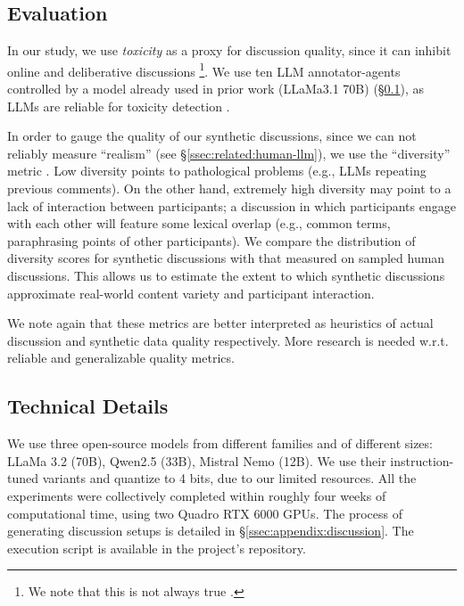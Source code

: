 \subsection{Evaluation}
\label{ssec:experimental:evaluation}

In our study, we use \emph{toxicity} as a proxy for discussion quality, since it can inhibit online and deliberative discussions \citep{dekock2022disagree, XiaToxicity}\footnote{We note that this is not always true \citep{Avalle2024PersistentIP}.}. We use ten \ac{LLM} annotator-agents controlled by a model already used in prior work (LLaMa3.1 70B) \cite{kang-qian-2024-implanting} (\S\ref{ssec:experimental:evaluation}), as \acp{LLM} are reliable for toxicity detection \citep{kang-qian-2024-implanting, Wang2022ToxicityDW, anjum2024hate}.

In order to gauge the quality of our synthetic discussions, since we can not reliably measure ``realism'' (see \S\ref{ssec:related:human-llm}), we use the ``diversity'' metric \citep{ulmer2024}. Low diversity points to pathological problems (e.g., \acp{LLM} repeating previous comments). On the other hand, extremely high diversity may point to a lack of interaction between participants; a discussion in which participants engage with each other will feature some lexical overlap (e.g., common terms, paraphrasing points of other participants). We compare the distribution of diversity scores for synthetic discussions with that measured on sampled human discussions. This allows us to estimate the extent to which synthetic discussions approximate real-world content variety and participant interaction. 

We note again that these metrics are better interpreted as heuristics of actual discussion and synthetic data quality respectively. More research is needed w.r.t. reliable and generalizable quality metrics.


\subsection{Technical Details}
\label{ssec:experimental:setup}

We use three open-source models from different families and of different sizes: LLaMa 3.2 (70B), Qwen2.5 (33B),  Mistral Nemo (12B). We use their instruction-tuned variants and quantize  to 4 bits, due to our limited resources. All the experiments were collectively completed within roughly four weeks of computational time, using two Quadro RTX 6000 GPUs. The process of generating discussion setups is detailed in \S\ref{ssec:appendix:discussion}. The execution script is available in the project's repository.\analysislink 